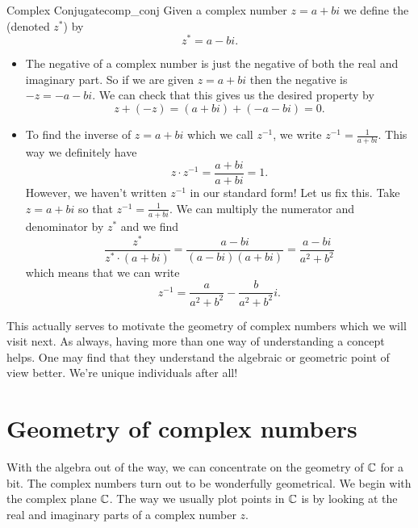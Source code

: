         \begin{df}{Complex Conjugate}{comp_conj}
        Given a complex number $z=a+bi$ we define the  (denoted $z^*$) by
        \[
        z^* = a-bi.
        \]
        \end{df}

        \begin{itemize}
            \item The negative of a complex number is just the negative of both the real and imaginary part. So if we are given $z=a+bi$ then the negative is $-z=-a-bi$.  We can check that this gives us the desired property by
            \[
            z+(-z)=(a+bi)+(-a-bi)=0.
            \]
            \item To find the inverse of $z=a+bi$ which we call $z^{-1}$, we write $z^{-1}=\frac{1}{a+bi}$.  This way we definitely have
            \[
            z\cdot z^{-1}=\frac{a+bi}{a+bi}=1.
            \]
            However, we haven't written $z^{-1}$ in our standard form! Let us fix this. Take $z=a+bi$ so that $z^{-1}=\frac{1}{a+bi}$.  We can multiply the numerator and denominator by $z^*$ and we find
            \[
            \frac{z^*}{z^*\cdot (a+bi)}=\frac{a-bi}{(a-bi)(a+bi)}=\frac{a-bi}{a^2+b^2}
            \]
            which means that we can write
            \[
            z^{-1}=\frac{a}{a^2+b^2}-\frac{b}{a^2+b^2}i.
            \]
        \end{itemize}

        This actually serves to motivate the geometry of complex numbers which we will visit next. As always, having more than one way of understanding a concept helps. One may find that they understand the algebraic or geometric point of view better.  We're unique individuals after all!

        \section{Geometry of complex numbers}

        With the algebra out of the way, we can concentrate on the geometry of $\mathbb{C}$ for a bit.  The complex numbers turn out to be wonderfully geometrical. We begin with the complex plane $\mathbb{C}$.  The way we usually plot points in $\mathbb{C}$ is by looking at the real and imaginary parts of a complex number $z$.

        \begin{center}
        \end{center}

